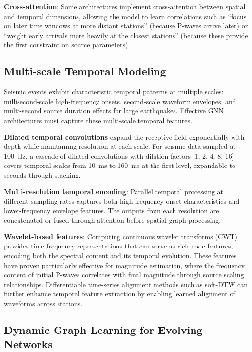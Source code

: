 \documentclass[review,authoryear]{elsarticle}
\begin{document}
\textbf{Cross-attention}: Some architectures implement cross-attention between spatial and temporal dimensions, allowing the model to learn correlations such as ``focus on later time windows at more distant stations'' (because P-waves arrive later) or ``weight early arrivals more heavily at the closest stations'' (because these provide the first constraint on source parameters).

\subsection{Multi-scale Temporal Modeling}

Seismic events exhibit characteristic temporal patterns at multiple scales: millisecond-scale high-frequency onsets, second-scale waveform envelopes, and multi-second source duration effects for large earthquakes. Effective GNN architectures must capture these multi-scale temporal features.

\textbf{Dilated temporal convolutions} expand the receptive field exponentially with depth while maintaining resolution at each scale. For seismic data sampled at 100~Hz, a cascade of dilated convolutions with dilation factors [1, 2, 4, 8, 16] covers temporal scales from 10~ms to 160~ms at the first level, expandable to seconds through stacking.

\textbf{Multi-resolution temporal encoding}: Parallel temporal processing at different sampling rates captures both high-frequency onset characteristics and lower-frequency envelope features. The outputs from each resolution are concatenated or fused through attention before spatial graph processing.

\textbf{Wavelet-based features}: Computing continuous wavelet transforms (CWT) provides time-frequency representations that can serve as rich node features, encoding both the spectral content and its temporal evolution. These features have proven particularly effective for magnitude estimation, where the frequency content of initial P-waves correlates with final magnitude through source scaling relationships. Differentiable time-series alignment methods such as soft-DTW \citep{cuturi2017soft} can further enhance temporal feature extraction by enabling learned alignment of waveforms across stations.

\subsection{Dynamic Graph Learning for Evolving Networks}
\end{document}
